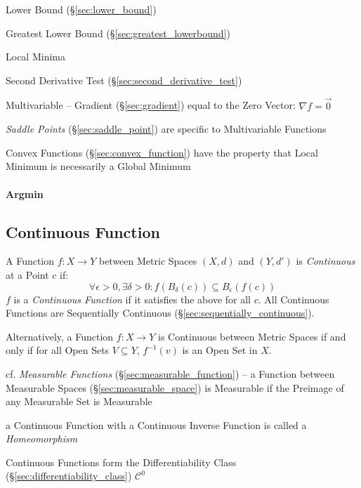 Lower Bound (\S\ref{sec:lower_bound})

Greatest Lower Bound (\S\ref{sec:greatest_lowerbound})

Local Minima

Second Derivative Test (\S\ref{sec:second_derivative_test})

Multivariable -- Gradient (\S\ref{sec:gradient}) equal to the Zero Vector:
$\nabla{f} = \vec{0}$

\fist \emph{Saddle Points} (\S\ref{sec:saddle_point}) are specific to
Multivariable Functions

Convex Functions (\S\ref{sec:convex_function}) have the property that Local
Minimum is necessarily a Global Minimum



\paragraph{Argmin}\label{sec:argmin}\hfill



\subsection{Continuous Function}\label{sec:continuous_function}

A Function $f : X \rightarrow Y$ between Metric Spaces $(X,d)$ and
$(Y,d')$ is \emph{Continuous} at a Point $c$ if:
\[
  \forall \epsilon > 0, \exists \delta > 0 :
  f (B_{\delta}(c)) \subseteq B_{\epsilon}(f(c))
\]
$f$ is a \emph{Continuous Function} if it satisfies the above for all
$c$. All Continuous Functions are Sequentially Continuous
(\S\ref{sec:sequentially_continuous}).

Alternatively, a Function $f: X \rightarrow Y$ is Continuous between
Metric Spaces if and only if for all Open Sets $V \subseteq Y$,
$f^{-1}(v)$ is an Open Set in $X$.

\fist cf. \emph{Measurable Functions} (\S\ref{sec:measurable_function}) -- a
Function between Measurable Spaces (\S\ref{sec:measurable_space}) is Measurable
if the Preimage of any Measurable Set is Measurable

a Continuous Function with a Continuous Inverse Function is called a
\emph{Homeomorphism}

Continuous Functions form the Differentiability Class
(\S\ref{sec:differentiability_class}) $\mathcal{C}^0$

